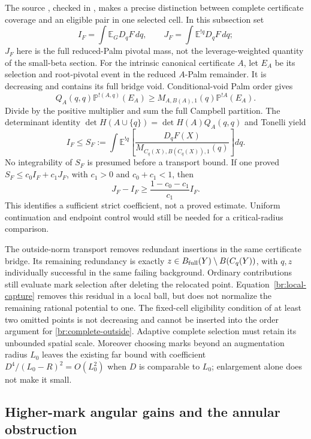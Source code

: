 \documentclass[11pt,a4paper]{article}
\theoremstyle{definition}
\theoremstyle{remark}
\numberwithin{equation}{section}
\begin{document}
The source , checked in
, makes a precise
distinction between complete certificate coverage and an eligible
pair in one selected cell. In this subsection set
\[
 I_F=\int\mathbb E_GD_qF\,dq,\qquad
 J_F=\int\mathbb E^{!q}D_qF\,dq;
\]
$J_F$ here is the full reduced-Palm pivotal mass, not the
leverage-weighted quantity of the small-beta section.
For the intrinsic canonical certificate $A$, let $E_A$ be its
selection and root-pivotal event in the reduced $A$-Palm remainder.
It is decreasing and contains its full bridge void. Conditional-void
Palm order gives
\[
 Q_A(q,q)\mathbb P^{!(A,q)}(E_A)
       \ge M_{A,B(A),1}(q)\mathbb P^{!A}(E_A).
\]
Divide by the positive multiplier and sum the full Campbell
partition. The determinant identity
$\det H(A\cup\{q\})=\det H(A)Q_A(q,q)$ and Tonelli yield
\begin{equation}\label{br:complete-outside}
 I_F\le S_F:=
 \int\mathbb E^{!q}\left[
   \frac{D_qF(X)}{M_{C_q(X),B(C_q(X)),1}(q)}\right]dq .
\end{equation}
No integrability of $S_F$ is presumed before a transport bound.
If one proved $S_F\le c_0I_F+c_1J_F$, with $c_1>0$ and
$c_0+c_1<1$, then
\[
 J_F-I_F\ge\frac{1-c_0-c_1}{c_1}I_F.
\]
This identifies a sufficient strict coefficient, not a proved
estimate. Uniform continuation and endpoint control would still
be needed for a critical-radius comparison.

The outside-norm transport removes redundant insertions in the same
certificate bridge. Its remaining redundancy is exactly
$z\in B_{\rm full}(Y)\setminus B(C_q(Y))$, with $q,z$ individually
successful in the same failing background. Ordinary contributions
still evaluate mark selection after deleting the relocated point.
Equation~\eqref{br:local-capture} removes this residual in a local ball,
but does not normalize the remaining rational potential to one.
The fixed-cell eligibility condition of at least two omitted points
is not decreasing and cannot be inserted into the order argument
for \eqref{br:complete-outside}. Adaptive complete selection must
retain its unbounded spatial scale. Moreover choosing marks beyond
an augmentation radius $L_0$ leaves the existing far bound with
coefficient $D^4/(L_0-R)^2=O(L_0^2)$ when $D$ is comparable to
$L_0$; enlargement alone does not make it small.

\subsection{Higher-mark angular gains and the annular obstruction}
\label{br:polygon}
\end{document}
